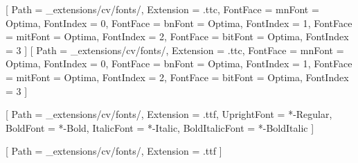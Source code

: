 \usepackage{xcolor}
\pagecolor{pagebg}

\usepackage{marvosym} %
\usepackage{parskip} %
\usepackage{ragged2e} %
\setlength{\RaggedRightParindent}{0pt}

\setlength{\parskip}{3pt} %
\linespread{1} %


\makeatletter
\renewcommand{\sectionlinesformat}[4]{%
  #3#4\par\nobreak
  \vspace{-12pt}%
  \rule{\textwidth}{0.5pt}\par\nobreak
  \vspace{-4pt}%
}
\makeatother


\usepackage{fontspec}
\setmainfont{Optima}[
  Path           = _extensions/cv/fonts/,
  Extension      = .ttc,
  FontFace       = {m}{n}{Font = Optima, FontIndex = 0},
  FontFace       = {b}{n}{Font = Optima, FontIndex = 1},
  FontFace       = {m}{it}{Font = Optima, FontIndex = 2},
  FontFace       = {b}{it}{Font = Optima, FontIndex = 3}
]
\setsansfont{Optima}[
  Path           = _extensions/cv/fonts/,
  Extension      = .ttc,
  FontFace       = {m}{n}{Font = Optima, FontIndex = 0},
  FontFace       = {b}{n}{Font = Optima, FontIndex = 1},
  FontFace       = {m}{it}{Font = Optima, FontIndex = 2},
  FontFace       = {b}{it}{Font = Optima, FontIndex = 3}
]


\setmonofont{MapleMono-NF}[
  Path           = _extensions/cv/fonts/,
  Extension      = .ttf,
  UprightFont    = *-Regular,
  BoldFont       = *-Bold,
  ItalicFont     = *-Italic,
  BoldItalicFont = *-BoldItalic
]

\newfontfamily{}[
  Path      = _extensions/cv/fonts/,
  Extension = .ttf
]

\newcommand{\liMapPin}{{\lucideicons\symbol{"E111}}}
\newcommand{\liPhone}{{\lucideicons\symbol{"E133}}}
\newcommand{\liMail}{{\lucideicons\symbol{"E10F}}}
\newcommand{\liGlobe}{{\lucideicons\symbol{"E0E8}}}
\newcommand{\liCompass}{{\lucideicons\symbol{"E09B}}}


